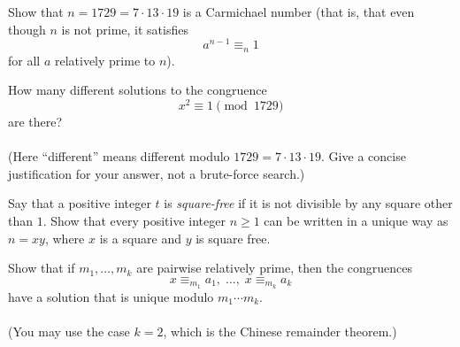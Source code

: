 \documentclass[12pt,letterpaper]{hmcpset}
\begin{document}
\begin{problem}[4]
    Show that $n=1729=7\cdot13\cdot19$ is a Carmichael number (that is, that even though $n$ is not prime, it satisfies
    \[
        a^{n-1}\equiv_n1
    \]
    for all $a$ relatively prime to $n$).
\end{problem}
\begin{solution}
    \vfill
\end{solution}
\newpage

\begin{problem}[5]
    How many different solutions to the congruence
    \[
        x^2\equiv1\pmod{1729}
    \]
    are there?\\\\
    (Here ``different'' means different modulo $1729=7\cdot13\cdot19$. Give a concise justification for your answer, not a brute-force search.)
\end{problem}
\begin{solution}
    \vfill
\end{solution}
\newpage

\begin{problem}[6]
    Say that a positive integer $t$ is {\it square-free\/} if it is not divisible by any square other than $1$. Show that every positive integer $n\ge1$ can be written in a unique way as $n=xy$, where $x$ is a square and $y$ is square free.
\end{problem}
\begin{solution}
    \vfill
\end{solution}
\newpage

\begin{problem}[7]
    Show that if $m_1,\ldots,m_k$ are pairwise relatively prime, then the congruences
    \[
        x\equiv_{m_1} a_1,\;\ldots,\;x\equiv_{m_k}a_k
    \]
    have a solution that is unique modulo $m_1\cdots m_k$.\\\\
    (You may use the case $k=2$, which is the Chinese remainder theorem.)
\end{problem}
\begin{solution}
    \vfill
\end{solution}
\end{document}
